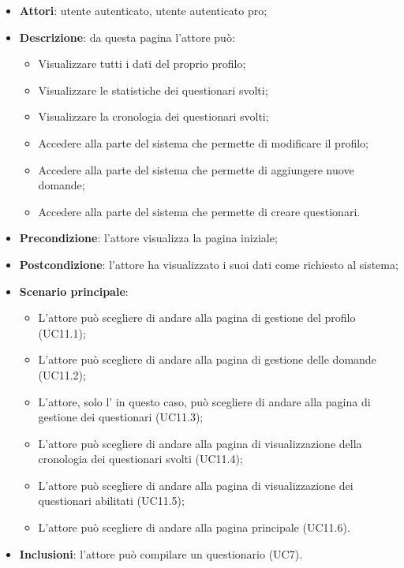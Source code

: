 \begin{itemize}
\item\textbf{Attori}: utente autenticato, utente autenticato pro;
\item\textbf{Descrizione}: da questa pagina l'attore può: 
\begin{itemize}
	\item Visualizzare tutti i dati del proprio profilo;
	\item Visualizzare le statistiche dei questionari svolti;
	\item Visualizzare la cronologia dei questionari svolti;
	\item Accedere alla parte del sistema che permette di modificare il profilo;
	\item Accedere alla parte del sistema che permette di aggiungere nuove domande;
	\item Accedere alla parte del sistema che permette di creare questionari.
\end{itemize}
\item\textbf{Precondizione}: l'attore visualizza la pagina iniziale;
\item\textbf{Postcondizione}: l'attore ha visualizzato i suoi dati come richiesto al sistema;
\item\textbf{Scenario principale}:
\begin{itemize}
\item L'attore può scegliere di andare alla pagina di gestione del profilo (UC11.1);
\item L'attore può scegliere di andare alla pagina di gestione delle domande (UC11.2);  
\item L'attore, solo l'\uaupro{} in questo caso, può scegliere di andare alla pagina di gestione dei questionari (UC11.3);
\item L'attore può scegliere di andare alla pagina di visualizzazione della cronologia dei questionari svolti (UC11.4);
\item L'attore può scegliere di andare alla pagina di visualizzazione dei questionari abilitati (UC11.5);
\item L'attore può scegliere di andare alla pagina principale (UC11.6).		
\end{itemize}
\item\textbf{Inclusioni}: l'attore può compilare un questionario (UC7).
\end{itemize}

